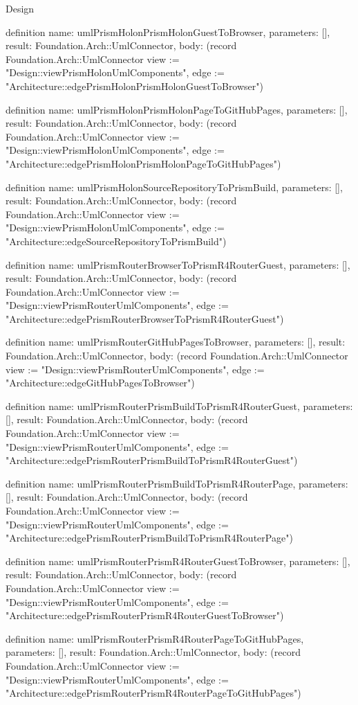 \begin{lexlean}{Design}
\begin{semanticmodule}
definition{
  name: umlPrismHolonPrismHolonGuestToBrowser,
  parameters: [],
  result: Foundation.Arch::UmlConnector,
  body: (record Foundation.Arch::UmlConnector {view := "Design::viewPrismHolonUmlComponents", edge := "Architecture::edgePrismHolonPrismHolonGuestToBrowser"})
}

definition{
  name: umlPrismHolonPrismHolonPageToGitHubPages,
  parameters: [],
  result: Foundation.Arch::UmlConnector,
  body: (record Foundation.Arch::UmlConnector {view := "Design::viewPrismHolonUmlComponents", edge := "Architecture::edgePrismHolonPrismHolonPageToGitHubPages"})
}

definition{
  name: umlPrismHolonSourceRepositoryToPrismBuild,
  parameters: [],
  result: Foundation.Arch::UmlConnector,
  body: (record Foundation.Arch::UmlConnector {view := "Design::viewPrismHolonUmlComponents", edge := "Architecture::edgeSourceRepositoryToPrismBuild"})
}

definition{
  name: umlPrismRouterBrowserToPrismR4RouterGuest,
  parameters: [],
  result: Foundation.Arch::UmlConnector,
  body: (record Foundation.Arch::UmlConnector {view := "Design::viewPrismRouterUmlComponents", edge := "Architecture::edgePrismRouterBrowserToPrismR4RouterGuest"})
}

definition{
  name: umlPrismRouterGitHubPagesToBrowser,
  parameters: [],
  result: Foundation.Arch::UmlConnector,
  body: (record Foundation.Arch::UmlConnector {view := "Design::viewPrismRouterUmlComponents", edge := "Architecture::edgeGitHubPagesToBrowser"})
}

definition{
  name: umlPrismRouterPrismBuildToPrismR4RouterGuest,
  parameters: [],
  result: Foundation.Arch::UmlConnector,
  body: (record Foundation.Arch::UmlConnector {view := "Design::viewPrismRouterUmlComponents", edge := "Architecture::edgePrismRouterPrismBuildToPrismR4RouterGuest"})
}

definition{
  name: umlPrismRouterPrismBuildToPrismR4RouterPage,
  parameters: [],
  result: Foundation.Arch::UmlConnector,
  body: (record Foundation.Arch::UmlConnector {view := "Design::viewPrismRouterUmlComponents", edge := "Architecture::edgePrismRouterPrismBuildToPrismR4RouterPage"})
}

definition{
  name: umlPrismRouterPrismR4RouterGuestToBrowser,
  parameters: [],
  result: Foundation.Arch::UmlConnector,
  body: (record Foundation.Arch::UmlConnector {view := "Design::viewPrismRouterUmlComponents", edge := "Architecture::edgePrismRouterPrismR4RouterGuestToBrowser"})
}

definition{
  name: umlPrismRouterPrismR4RouterPageToGitHubPages,
  parameters: [],
  result: Foundation.Arch::UmlConnector,
  body: (record Foundation.Arch::UmlConnector {view := "Design::viewPrismRouterUmlComponents", edge := "Architecture::edgePrismRouterPrismR4RouterPageToGitHubPages"})
}


\end{semanticmodule}
\end{lexlean}
